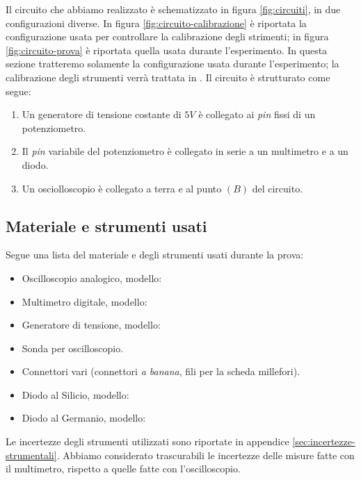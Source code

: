 \documentclass[11pt, a4paper, twocolumn]{article}
\begin{document}
    Il circuito che abbiamo realizzato è schematizzato in figura \ref{fig:circuiti}, in due configurazioni diverse. In figura \ref{fig:circuito-calibrazione}
    è riportata la configurazione usata per controllare la calibrazione degli strimenti; in figura \ref{fig:circuito-prova}
    è riportata quella usata durante l'esperimento. In questa sezione tratteremo solamente la configurazione usata durante l'esperimento;
    la calibrazione degli strumenti verrà trattata in %
    . Il circuito è strutturato come segue:
    \begin{enumerate}
      \item%
        Un generatore di tensione costante di $5V$ è collegato ai \emph{pin} fissi di un potenziometro.
      \item%
        Il \emph{pin} variabile del potenziometro è collegato in serie a un multimetro e a un diodo.
      \item%
        Un osciolloscopio è collegato a terra e al punto $(B)$ del circuito. 
    \end{enumerate}

  \subsection{Materiale e strumenti usati}\label{subsec:materiali}
    Segue una lista del materiale e degli strumenti usati durante la prova:
      \begin{itemize}
        \item%
          Oscilloscopio analogico, modello: %
        \item%
          Multimetro digitale, modello: %
        \item%
          Generatore di tensione, modello: %
        \item%
          Sonda per oscilloscopio.
        \item%
          Connettori vari (connettori \emph{a banana}, fili per la scheda millefori).
        \item%
          Diodo al Silicio, modello: %
        \item%
          Diodo al Germanio, modello: %
      \end{itemize}
    Le incertezze degli strumenti utilizzati sono riportate in appendice \ref{sec:incertezze-strumentali}.
    Abbiamo considerato trascurabili le incertezze delle misure fatte con il multimetro, rispetto a quelle fatte con l'oscilloscopio.
\end{document}
